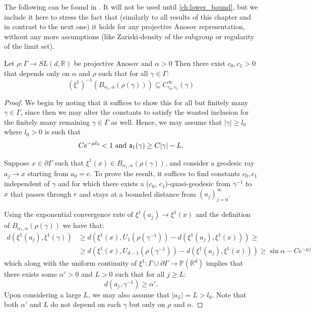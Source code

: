 \documentclass{report}
\begin{document}
The following can be found in \cite[Proposition 3.3]{pozzetti_anosov_2023}.
It will not be used until \cref{ch:lower_bound}, but we include it here to stress the fact that (similarly to all results of this chapter and in contrast to the next one) it holds for any projective Anosov representation, without any more assumptions (like Zariski-density of the subgroup or regularity of the limit set).
\begin{proposition}\label{prop:shadows}
    Let $\rho: \Gamma \to SL(d, \mathbb R)$ be projective Anosov and $\alpha > 0$
    Then there exist $c_0, c_1 > 0$ that depends only on $\alpha$ and $\rho$ such that for all $\gamma \in \Gamma$:
    \[
        (\xi^1)^{-1}(B_{\alpha_1, \alpha}(\rho(\gamma))) \subseteq C_{c_0,c_1}^\infty(\gamma)
    \]
\end{proposition}
\begin{proof}
    We begin by noting that it suffices to show this for all but finitely many $\gamma \in \Gamma$, since then we may alter the constants to satisfy the wanted inclusion for the finitely many remaining $\gamma \in \Gamma$ as well. 
    Hence, we may assume that $|\gamma| \geq l_0$ where $l_0 > 0$ is such that 
    \[
        Ce^{-\mu l_0} < 1 \text{ and } {\sf a}_1(\gamma) \geq C|\gamma| - L.
    \]

    Suppose $x \in \partial \Gamma$ such that $\xi^1(x) \in B_{\alpha_1, \alpha}(\rho(\gamma))$, and consider a geodesic ray $a_j \to x$ starting from $a_0 = e$.
    To prove the result, it suffices to find constants $c_0, c_1$ independent of $\gamma$ and for which there exists a ($c_0$, $c_1$)-quasi-geodesic from $\gamma^{-1}$ to $x$ that passes through $e$ and stays at a bounded distance from $(a_j)_{j=0}^\infty$.

    Using the exponential convergence rate of $\xi^1(a_j) \to \xi^1(x)$ and the definition of $B_{\alpha_1, \alpha}(\rho(\gamma))$ we have that:
    \begin{align*}
        d(\xi^1(a_j), \xi^1(\gamma)) &\geq
        d(\xi^1(x), U_1(\rho(\gamma^{-1}))-d(\xi^1(a_j), \xi^1(x)))
        \geq \\
        &\geq
        d(\xi^1(x), U_{d-1}(\rho(\gamma^{-1}))-d(\xi^1(a_j), \xi^1(x)))
        \geq
        \sin \alpha - Ce^{-\mu j}
    \end{align*}
    which along with the uniform continuity of $\xi^1: \Gamma \cup \partial \Gamma \to \mathbb P(\mathbb R^d)$ implies that there exists some $\alpha' > 0$ and $L>0$ such that for all $j\geq L$:
    \[
        d(a_j, \gamma^{-1}) \geq \alpha'.
    \]
    Upon considering a large $L$, we may also assume that $|a_L| = L > l_0$. Note that both $\alpha'$ and $L$ do not depend on each $\gamma$ but only on $\rho$ and $\alpha$.


\end{proof}
\end{document}
